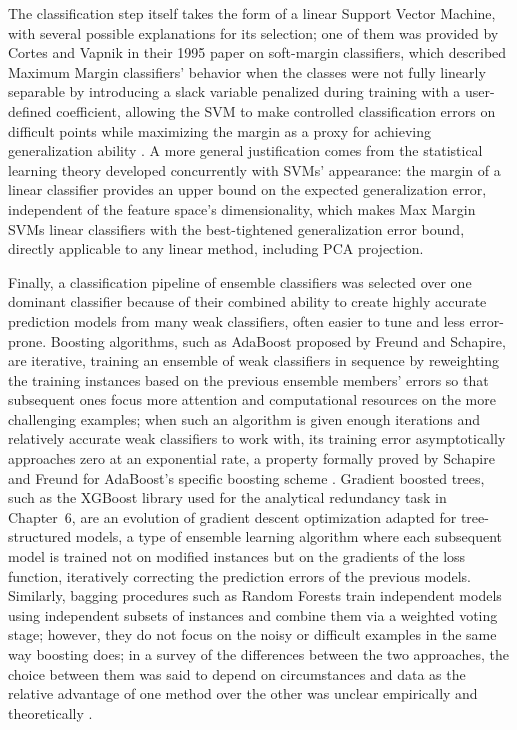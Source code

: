 The classification step itself takes the form of a linear Support Vector Machine, with several possible explanations for its selection; one of them was provided by Cortes and Vapnik in their 1995 paper on soft-margin classifiers, which described Maximum Margin classifiers' behavior when the classes were not fully linearly separable by introducing a slack variable penalized during training with a user-defined coefficient, allowing the SVM to make controlled classification errors on difficult points while maximizing the margin as a proxy for achieving generalization ability \cite{cortes1995support}. A more general justification comes from the statistical learning theory developed concurrently with SVMs' appearance: the margin of a linear classifier provides an upper bound on the expected generalization error, independent of the feature space's dimensionality, which makes Max Margin SVMs linear classifiers with the best-tightened generalization error bound, directly applicable to any linear method, including PCA projection.

Finally, a classification pipeline of ensemble classifiers was selected over one dominant classifier because of their combined ability to create highly accurate prediction models from many weak classifiers, often easier to tune and less error-prone. Boosting algorithms, such as AdaBoost proposed by Freund and Schapire, are iterative, training an ensemble of weak classifiers in sequence by reweighting the training instances based on the previous ensemble members' errors so that subsequent ones focus more attention and computational resources on the more challenging examples; when such an algorithm is given enough iterations and relatively accurate weak classifiers to work with, its training error asymptotically approaches zero at an exponential rate, a property formally proved by Schapire and Freund for AdaBoost's specific boosting scheme \cite{freund1997decisiontheoretic}. Gradient boosted trees, such as the XGBoost library used for the analytical redundancy task in Chapter~6, are an evolution of gradient descent optimization adapted for tree-structured models, a type of ensemble learning algorithm where each subsequent model is trained not on modified instances but on the gradients of the loss function, iteratively correcting the prediction errors of the previous models. Similarly, bagging procedures such as Random Forests train independent models using independent subsets of instances and combine them via a weighted voting stage; however, they do not focus on the noisy or difficult examples in the same way boosting does; in a survey of the differences between the two approaches, the choice between them was said to depend on circumstances and data as the relative advantage of one method over the other was unclear empirically and theoretically \cite{mienye2022survey}.

